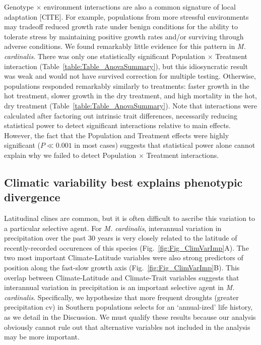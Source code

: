 \documentclass[11pt, oneside]{article}\usepackage[]{graphicx}\usepackage[]{color}
\begin{document}
Genotype $\times$ environment interactions are also a common signature of local adaptation [CITE]. For example, populations from more stressful environments may tradeoff reduced growth rate under benign conditions for the ability to tolerate stress by maintaining positive growth rates and/or surviving through adverse conditions. We found remarkably little evidence for this pattern in \textit{M. cardinalis}. There was only one statistically significant Population $\times$ Treatment interaction (Table~\ref{table:Table_AnovaSummary}), but this idiosyncratic result was weak and would not have survived correction for multiple testing. Otherwise, populations responded remarkably similarly to treatments: faster growth in the hot treatment, slower growth in the dry treatment, and high mortality in the hot, dry treatment (Table~\ref{table:Table_AnovaSummary}). Note that interactions were calculated after factoring out intrinsic trait differences, necessarily reducing statistical power to detect significant interactions relative to main effects. However, the fact that the Population and Treatment effects were highly significant ($P \ll 0.001$ in most cases) suggests that statistical power alone cannot explain why we failed to detect Population $\times$ Treatment interactions.

\subsection*{Climatic variability best explains phenotypic divergence}

Latitudinal clines are common, but it is often difficult to ascribe this variation to a particular selective agent. For \textit{M. cardinalis}, interannual variation in precipitation over the past 30 years is very closely related to the latitude of recently-recorded occurences of this species (Fig.~\ref{fig:Fig_ClimVarImp}A). The two most important Climate-Latitude variables were also strong predictors of position along the fast-slow growth axis (Fig.~\ref{fig:Fig_ClimVarImp}B). This overlap between Climate-Latitude and Climate-Trait variables suggests that interannual variation in precipitation is an important selective agent in \textit{M. cardinalis}. Specifically, we hypothesize that more frequent droughts (greater precipitation cv) in Southern populations selects for an `annual-ized' life history, as we detail in the Discussion. We must qualify these results because our analysis obviously cannot rule out that alternative variables not included in the analysis may be more important.
\end{document}
